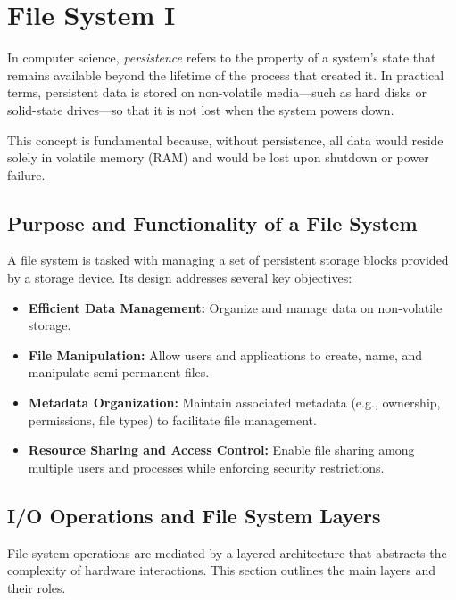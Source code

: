 \chapter{File System I}
\vfill

\begin{definition}[Persistence]
In computer science, \emph{persistence} refers to the property of a system's state that remains available beyond the lifetime of the process that created it. In practical terms, persistent data is stored on non-volatile media—such as hard disks or solid-state drives—so that it is not lost when the system powers down.
\end{definition}
This concept is fundamental because, without persistence, all data would reside solely in volatile memory (RAM) and would be lost upon shutdown or power failure.

\section{Purpose and Functionality of a File System}
A file system is tasked with managing a set of persistent storage blocks provided by a storage device. Its design addresses several key objectives:
\begin{itemize}[itemsep=2pt, topsep=1pt]
  \item \textbf{Efficient Data Management:} Organize and manage data on non-volatile storage.
  \item \textbf{File Manipulation:} Allow users and applications to create, name, and manipulate semi-permanent files.
  \item \textbf{Metadata Organization:} Maintain associated metadata (e.g., ownership, permissions, file types) to facilitate file management.
  \item \textbf{Resource Sharing and Access Control:} Enable file sharing among multiple users and processes while enforcing security restrictions.
\end{itemize}

\newpage
\section{I/O Operations and File System Layers}
File system operations are mediated by a layered architecture that abstracts the complexity of hardware interactions. This section outlines the main layers and their roles.

